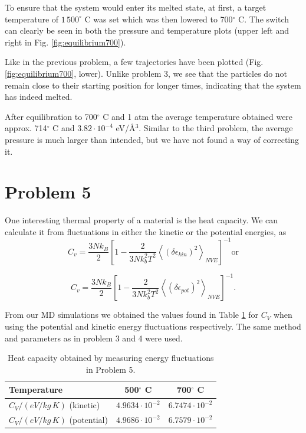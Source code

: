 To ensure that the system would enter its melted state, at first, a target temperature of $1\,500^\circ$ C was set which was then lowered to 700$^\circ$ C. The switch can clearly be seen in both the pressure and temperature plots (upper left and right in Fig. \ref{fig:equilibrium700}).

Like in the previous problem, a few trajectories have been plotted (Fig. \ref{fig:equilibrium700}, lower). Unlike problem 3, we see that the particles do not remain close to their starting position for longer times, indicating that the system has indeed melted.

After equilibration to 700$^\circ$ C and 1 atm the average temperature obtained were approx. 714$^\circ$ C and $3.82 \cdot 10^{-4}$ eV/\r{A}$^3$. Similar to the third problem, the average pressure is much larger than intended, but we have not found a way of correcting it.

\section*{Problem 5}

\noindent One interesting thermal property of a material is the heat capacity. We can calculate it from fluctuations in either the kinetic or the potential energies, as
\begin{equation}
C_v=\frac{3Nk_B}{2}\left[1-\frac{2}{3Nk_b^2T^2}\left\langle \left(\delta \epsilon_{kin}\right)^2  \right\rangle_{NVE} \right]^{-1} \text{or}
\end{equation}

\begin{equation}
C_v=\frac{3Nk_B}{2}\left[1-\frac{2}{3Nk_b^2T^2}\left\langle \left(\delta \epsilon_{pot}\right)^2  \right\rangle_{NVE} \right]^{-1}.
\end{equation}

From our MD simulations we obtained the values found in {Table \ref{tab:prob5}} for $C_V$ when using the potential and kinetic energy fluctuations respectively. The same method and parameters as in problem 3 and 4 were used.

\begin{table}[h!]
	\centering
	\caption{Heat capacity obtained by measuring energy fluctuations in Problem 5.}
	\begin{tabular}{l|cc}
		\hline \textbf{Temperature} & \textbf{500$^\circ$ C} & \textbf{700$^\circ$ C} \\ \hline
		$C_V / (\unit{eV/kg\,K})$ (kinetic) & $4.9634 \cdot 10^{-2}$ & $6.7474 \cdot 10^{-2}$ \\
		$C_V / (\unit{eV/kg\,K})$ (potential) & $4.9686 \cdot 10^{-2}$ & $6.7579 \cdot 10^{-2}$ \\ \hline
	\end{tabular}
	\label{tab:prob5}
\end{table}

